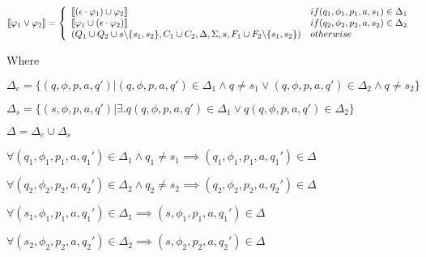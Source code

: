 $\bracket[\varphi_1\vee\varphi_2]=\left\{\begin{array}{ll}
    \bracket[(\epsilon\cdot\varphi_1)\cup\varphi_2] & if (q_1,\phi_1,p_1,a,s_1)\in\Delta_1 \\
    \bracket[\varphi_1\cup(\epsilon\cdot\varphi_2)] & if (q_2,\phi_2,p_2,a,s_2)\in\Delta_2 \\
    (Q_1\cup Q_2 \cup {s}\backslash\{s_1,s_2\},C_1\cup C_2,\Delta,\Sigma,s,F_1\cup F_2\backslash\{s_1,s_2\}) & otherwise \\
    \end{array}\right.
    $
    
    Where
    
    $\Delta_e=\{(q,\phi,p,a,q')|
    (q,\phi,p,a,q')\in\Delta_1\wedge q\neq s_1
    \vee
    (q,\phi,p,a,q')\in\Delta_2\wedge q\neq s_2\}$

    $\Delta_s=\{(s,\phi,p,a,q')|
    \exists. q (q,\phi,p,a,q')\in\Delta_1
    \vee    q (q,\phi,p,a,q')\in\Delta_2\}$

    $\Delta=\Delta_e\cup\Delta_s$
    \newline

    $\forall (q_1,\phi_1,p_1,a,q_1')\in\Delta_1\wedge q_1\neq s_1 \implies (q_1,\phi_1,p_1,a,q_1')\in\Delta$
    
    $\forall (q_2,\phi_2,p_2,a,q_2')\in\Delta_2\wedge q_2\neq s_2 \implies (q_2,\phi_2,p_2,a,q_2')\in\Delta$
    
    $\forall (s_1,\phi_1,p_1,a,q_1')\in\Delta_1\implies (s,\phi_1,p_1,a,q_1')\in\Delta$
    
    $\forall (s_2,\phi_2,p_2,a,q_2')\in\Delta_2\implies (s,\phi_2,p_2,a,q_2')\in\Delta$